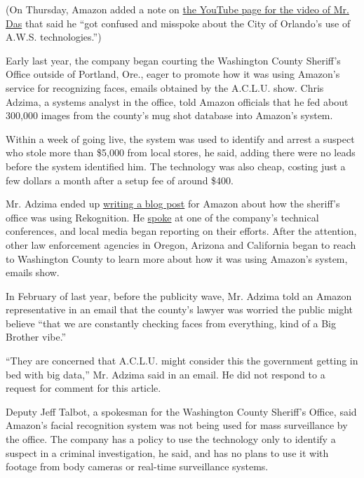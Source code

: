 (On Thursday, Amazon added a note on
\href{https://www.youtube.com/watch?time_continue=1628\&v=sUzuJc-xBEE}{the
YouTube page for the video of Mr. Das} that said he ``got confused and
misspoke about the City of Orlando's use of A.W.S. technologies.'')

Early last year, the company began courting the Washington County
Sheriff's Office outside of Portland, Ore., eager to promote how it was
using Amazon's service for recognizing faces, emails obtained by the
A.C.L.U. show. Chris Adzima, a systems analyst in the office, told
Amazon officials that he fed about 300,000 images from the county's mug
shot database into Amazon's system.

Within a week of going live, the system was used to identify and arrest
a suspect who stole more than \$5,000 from local stores, he said, adding
there were no leads before the system identified him. The technology was
also cheap, costing just a few dollars a month after a setup fee of
around \$400.

Mr. Adzima ended up
\href{https://aws.amazon.com/blogs/machine-learning/using-amazon-rekognition-to-identify-persons-of-interest-for-law-enforcement/}{writing
a blog post} for Amazon about how the sheriff's office was using
Rekognition. He \href{https://youtu.be/LwjaPKo1Qkk?t=26m42s}{spoke} at
one of the company's technical conferences, and local media began
reporting on their efforts. After the attention, other law enforcement
agencies in Oregon, Arizona and California began to reach to Washington
County to learn more about how it was using Amazon's system, emails
show.

In February of last year, before the publicity wave, Mr. Adzima told an
Amazon representative in an email that the county's lawyer was worried
the public might believe ``that we are constantly checking faces from
everything, kind of a Big Brother vibe.''

``They are concerned that A.C.L.U. might consider this the government
getting in bed with big data,'' Mr. Adzima said in an email. He did not
respond to a request for comment for this article.

Deputy Jeff Talbot, a spokesman for the Washington County Sheriff's
Office, said Amazon's facial recognition system was not being used for
mass surveillance by the office. The company has a policy to use the
technology only to identify a suspect in a criminal investigation, he
said, and has no plans to use it with footage from body cameras or
real-time surveillance systems.

